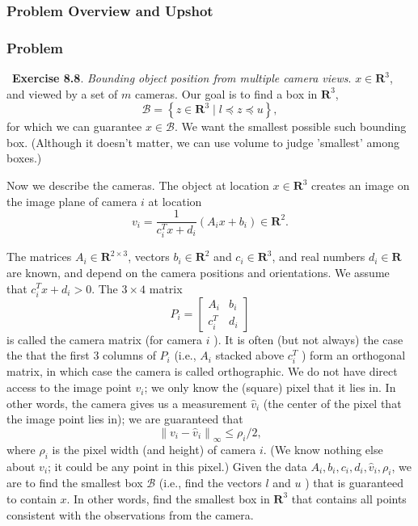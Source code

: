 \documentclass[12pt,reqno]{article}
\theoremstyle{definition}
\numberwithin{equation}{section}
\begin{document}
\subsubsection*{Problem Overview and Upshot}

\subsubsection*{Problem}

~\cite{EE364a-extra}\textbf{Exercise 8.8}. \textit{Bounding object position from multiple camera views}.
$x \in \mathbf{R}^3$, and viewed by a set of $m$ cameras. Our goal is to find a box in $\mathbf{R}^3$,
\[
\mathcal{B}=\left\{z \in \mathbf{R}^3 \mid l \preceq z \preceq u\right\},
\]
for which we can guarantee $x \in \mathcal{B}$. We want the smallest possible such bounding box. (Although it doesn't matter, we can use volume to judge 'smallest' among boxes.)

\noindent Now we describe the cameras. The object at location $x \in \mathbf{R}^3$ creates an image on the image plane of camera $i$ at location
\[
v_i=\frac{1}{c_i^T x+d_i}\left(A_i x+b_i\right) \in \mathbf{R}^2 .
\]

\noindent The matrices $A_i \in \mathbf{R}^{2 \times 3}$, vectors $b_i \in \mathbf{R}^2$ and $c_i \in \mathbf{R}^3$, and real numbers $d_i \in \mathbf{R}$ are known, and depend on the camera positions and orientations. We assume that $c_i^T x+d_i>0$. The $3 \times 4$ matrix
\[
P_i=\left[\begin{array}{ll}
A_i & b_i \\
c_i^T & d_i
\end{array}\right]
\]
is called the camera matrix (for camera $i$ ). It is often (but not always) the case the that the first 3 columns of $P_i$ (i.e., $A_i$ stacked above $c_i^T$ ) form an orthogonal matrix, in which case the camera is called orthographic.
We do not have direct access to the image point $v_i$; we only know the (square) pixel that it lies in. In other words, the camera gives us a measurement $\hat{v}_i$ (the center of the pixel that the image point lies in); we are guaranteed that
\[
\left\|v_i-\hat{v}_i\right\|_{\infty} \leq \rho_i / 2,
\]
where $\rho_i$ is the pixel width (and height) of camera $i$. (We know nothing else about $v_i$; it could be any point in this pixel.)
Given the data $A_i, b_i, c_i, d_i, \hat{v}_i, \rho_i$, we are to find the smallest box $\mathcal{B}$ (i.e., find the vectors $l$ and $u$ ) that is guaranteed to contain $x$.
In other words, find the smallest box in $\mathbf{R}^3$ that contains all points consistent with the observations from the camera.
\end{document}
